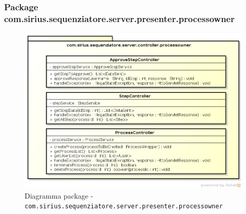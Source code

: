 \subsubsection{Package com.sirius.sequenziatore.server.presenter.processowner}
\begin{figure}[H] \centering \includegraphics[width=%
\textwidth]
{./classi/server/controllerprocessowner.png} \caption{Diagramma package - \texttt{com.sirius.sequenziatore.server.presenter.processowner}}
\end{figure}
